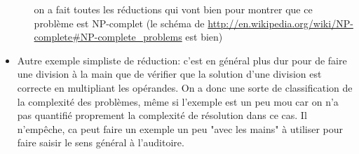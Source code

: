 \documentclass{article}
\begin{document}
\begin{itemize}
\begin{itemize}
on a fait toutes les réductions qui vont bien pour montrer que ce problème est
NP-complet (le schéma de
\url{http://en.wikipedia.org/wiki/NP-complete#NP-complete_problems} est bien)
\end{itemize}
\item Autre exemple simpliste de réduction: c'est en général plus dur pour de
faire une division à la main que de vérifier que la solution d'une division est
correcte en multipliant les opérandes. On a donc une sorte de classification de
la complexité des problèmes, même si l'exemple est un peu mou car on n'a pas
quantifié proprement la complexité de résolution dans ce cas. Il n'empêche, ca
peut faire un exemple un peu "avec les mains" à utiliser pour faire saisir le
sens général à l'auditoire.
\end{itemize}
\end{document}
